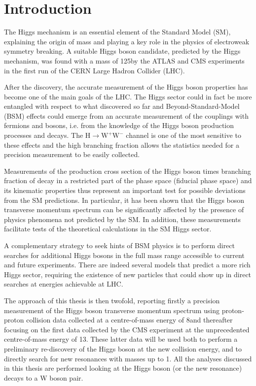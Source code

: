 \chapter*{Introduction}
\thispagestyle{empty}

The Higgs mechanism is an essential element of the Standard Model (SM), explaining the origin of mass and playing a key role in the physics of electroweak symmetry breaking. A suitable Higgs boson candidate, predicted by the Higgs mechanism, was found with a mass of 125\GeV by the ATLAS and CMS experiments in the first run of the CERN Large Hadron Collider (LHC).

After the discovery, the accurate measurement of the Higgs boson properties has become one of the main goals of the LHC. The Higgs sector could in fact be more entangled with respect to what discovered so far and Beyond-Standard-Model (BSM) effects could emerge from an accurate measurement of the couplings with fermions and bosons, i.e. from the knowledge of the Higgs boson production processes and decays. The $\mathrm{H \to W^+W^-}$ channel is one of the most sensitive to these effects and the high branching fraction allows the statistics needed for a precision measurement to be easily collected.

Measurements of the production cross section of the Higgs boson times branching fraction of decay in a restricted part of the phase space (fiducial phase space) and its kinematic properties thus represent an important test for possible deviations from the SM predictions.
In particular, it has been shown that the Higgs boson transverse momentum spectrum can be significantly affected by the presence of physics phenomena not predicted by the SM. In addition, these measurements facilitate tests of the theoretical calculations in the SM Higgs sector.

A complementary strategy to seek hints of BSM physics is to perform direct searches for additional Higgs bosons in the full mass range accessible to current and future experiments. There are indeed several models that predict a more rich Higgs sector, requiring the existence of new particles that could show up in direct searches at energies achievable at LHC.

The approach of this thesis is then twofold, reporting firstly a precision measurement of the Higgs boson transverse momentum spectrum using proton-proton collision data collected at a centre-of-mass energy of 8\TeV and thereafter focusing on the first data collected by the CMS experiment at the unprecedented centre-of-mass energy of 13\TeV. These latter data will be used both to perform a preliminary re-discovery of the Higgs boson at the new collision energy, and to directly search for new resonances with masses up to 1\TeV. All the analyses discussed in this thesis are performed looking at the Higgs boson (or the new resonance) decays to a W boson pair.

